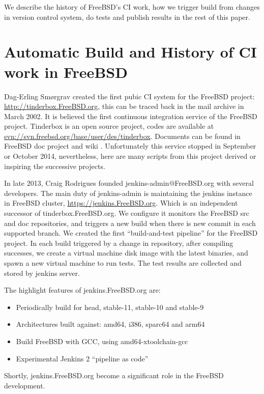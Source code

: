 \documentclass[a4paper,twocolumn,10pt]{article}
\begin{document}
We describe the history of FreeBSD's CI work, how we trigger build from changes
in version control system, do tests and publish results in the rest of this
paper.

\section{Automatic Build and History of CI work in FreeBSD}

Dag-Erling Smørgrav created the first pubic CI system for the FreeBSD project:
\url{http://tinderbox.FreeBSD.org}, this can be traced back in the mail archive
in March 2002. It is believed the first continuous integration service of the
FreeBSD project. Tinderbox is an open source project, codes are available at
\url{svn://svn.freebsd.org/base/user/des/tinderbox}.  Documents can be found in
FreeBSD doc project \cite{tinerbox-doc} and wiki \cite{tinerbox-wiki}.
Unfortunately this service stopped in September or October 2014, nevertheless,
here are many scripts from this project derived or inspiring the successive
projects.

In late 2013, Craig Rodrigues founded jenkins-admin@FreeBSD.org with several
developers. The main duty of jenkins-admin is maintaining the jenkins
instance in FreeBSD cluster, \url{https://jenkins.FreeBSD.org}. Which is an
independent successor of tinderbox.FreeBSD.org. We configure it monitors the
FreeBSD src and doc repositories, and triggers a new build when there is new
commit in each supported branch. We created the first ``build-and-test pipeline''
for the FreeBSD project. In each build triggered by a change in repository,
after compiling successes, we create a virtual machine disk image with the
latest binaries, and spawn a new virtual machine to run tests. The test results
are collected and stored by jenkins server.

The highlight features of jenkins.FreeBSD.org are:

\begin{itemize}
\item Periodically build for head, stable-11, stable-10 and stable-9
\item Architectures built against: amd64, i386, sparc64 and arm64
\item Build FreeBSD with GCC, using amd64-xtoolchain-gcc
\item Experimental Jenkins 2 ``pipeline as code''
\end{itemize}

Shortly, jenkins.FreeBSD.org become a significant role in the FreeBSD
development.
\end{document}
